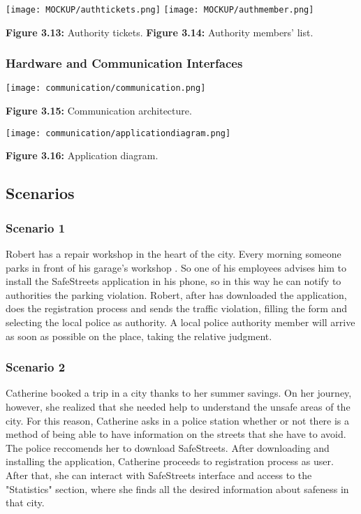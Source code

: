 \documentclass[12pt]{article}
\begin{document}
  \texttt{[image: MOCKUP/authtickets.png]}                  \hfill \texttt{[image: MOCKUP/authmember.png]}
		 
		 \textbf{Figure 3.13:} Authority tickets.  \hfill \textbf{Figure 3.14:} Authority members' list.



\subsubsection{Hardware and Communication Interfaces}
\vspace{5mm}
\begin{center}
\texttt{[image: communication/communication.png]}                 

\textbf{Figure 3.15:} Communication architecture. 
\end{center}

\begin{center}
\texttt{[image: communication/applicationdiagram.png]}                 

\textbf{Figure 3.16:} Application diagram. 
\end{center}

\newpage

\subsection{Scenarios}
\subsubsection{Scenario 1}
\vspace{2mm}
Robert has a repair workshop in the heart of the city. Every morning someone parks in front of his garage’s workshop . So one of his employees advises him to install the SafeStreets application in his phone, so in this way he can notify to authorities the parking violation. Robert, after has downloaded the application, does the registration process and sends the traffic violation, filling the form and selecting the local police as authority. A local police authority member will arrive as soon as possible on the place, taking the relative judgment.


\subsubsection{Scenario 2}
\vspace{2mm}
Catherine booked a trip in a city thanks to her summer savings. On her journey, however, she realized that she needed help to understand the unsafe areas of the city. For this reason, Catherine asks in a police station whether or not there is a method of being able to have information on the streets that she have to avoid. The police reccomends her to download SafeStreets. After downloading and installing the application, Catherine proceeds to registration process as user. After that, she can interact with SafeStreets interface and access to the "Statistics" section, where she finds all the desired information about safeness in that city. 
\end{document}
